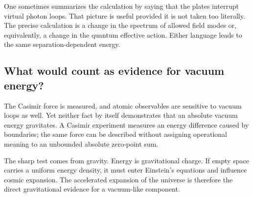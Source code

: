 \begin{classroomqa}
\end{classroomqa}

One sometimes summarizes the calculation by saying that the plates interrupt virtual photon loops. That picture is useful provided it is not taken too literally. The precise calculation is a change in the spectrum of allowed field modes or, equivalently, a change in the quantum effective action. Either language leads to the same separation-dependent energy.

\begin{classroomqa}
\end{classroomqa}

\subsection{What would count as evidence for vacuum energy?}

The Casimir force is measured, and atomic observables are sensitive to vacuum loops as well. Yet neither fact by itself demonstrates that an absolute vacuum energy gravitates. A Casimir experiment measures an energy difference caused by boundaries; the same force can be described without assigning operational meaning to an unbounded absolute zero-point sum.

The sharp test comes from gravity. Energy is gravitational charge. If empty space carries a uniform energy density, it must enter Einstein's equations and influence cosmic expansion. The accelerated expansion of the universe is therefore the direct gravitational evidence for a vacuum-like component.

